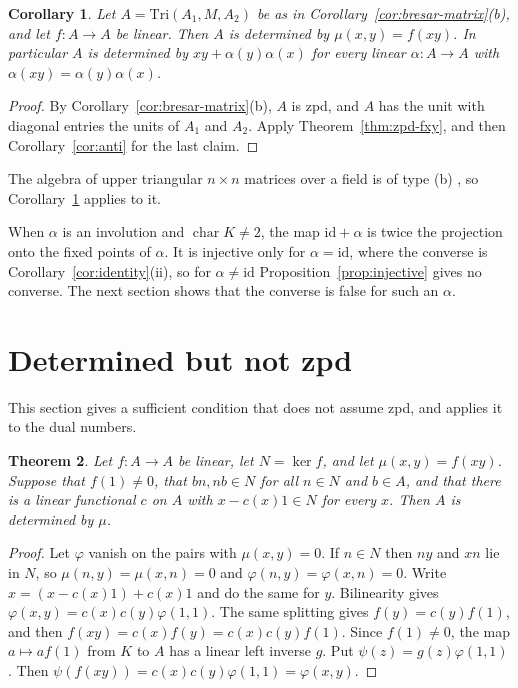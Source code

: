 \documentclass[]{interact}
\theoremstyle{plain}
\newtheorem{theorem}{Theorem}[section]
\newtheorem{corollary}[theorem]{Corollary}
\theoremstyle{definition}
\theoremstyle{remark}
\begin{document}
\begin{corollary}\label{cor:triangular}
Let $A = \mathrm{Tri}(A_1, M, A_2)$ be as in Corollary~\ref{cor:bresar-matrix}(b), and let $f \colon A \to A$ be linear.
Then $A$ is determined by $\mu(x,y) = f(xy)$.
In particular $A$ is determined by $xy + \alpha(y)\alpha(x)$ for every linear $\alpha \colon A \to A$ with $\alpha(xy) = \alpha(y)\alpha(x)$.
\end{corollary}

\begin{proof}
By Corollary~\ref{cor:bresar-matrix}(b), $A$ is zpd, and $A$ has the unit with diagonal entries the units of $A_1$ and $A_2$.
Apply Theorem~\ref{thm:zpd-fxy}, and then Corollary~\ref{cor:anti} for the last claim.
\end{proof}

The algebra of upper triangular $n \times n$ matrices over a field is of type (b) \citep[Example 2.19]{Bresar2021}, so Corollary~\ref{cor:triangular} applies to it. %

When $\alpha$ is an involution and $\operatorname{char} K \neq 2$, the map $\mathrm{id} + \alpha$ is twice the projection onto the fixed points of $\alpha$.
It is injective only for $\alpha = \mathrm{id}$, where the converse is Corollary~\ref{cor:identity}(ii), so for $\alpha \neq \mathrm{id}$ Proposition~\ref{prop:injective} gives no converse.
The next section shows that the converse is false for such an $\alpha$.

\section{Determined but not zpd}\label{sec:beyond}

This section gives a sufficient condition that does not assume zpd, and applies it to the dual numbers.

\begin{theorem}\label{thm:codim}
Let $f \colon A \to A$ be linear, let $N = \ker f$, and let $\mu(x,y) = f(xy)$.
Suppose that $f(1) \neq 0$, that $bn, nb \in N$ for all $n \in N$ and $b \in A$, and that there is a linear functional $c$ on $A$ with $x - c(x)1 \in N$ for every $x$.
Then $A$ is determined by $\mu$.
\end{theorem}

\begin{proof}
Let $\varphi$ vanish on the pairs with $\mu(x,y) = 0$.
If $n \in N$ then $ny$ and $xn$ lie in $N$, so $\mu(n,y) = \mu(x,n) = 0$ and $\varphi(n,y) = \varphi(x,n) = 0$.
Write $x = (x - c(x)1) + c(x)1$ and do the same for $y$.
Bilinearity gives $\varphi(x,y) = c(x)c(y)\varphi(1,1)$.
The same splitting gives $f(y) = c(y) f(1)$, and then $f(xy) = c(x) f(y) = c(x)c(y) f(1)$.
Since $f(1) \neq 0$, the map $a \mapsto a f(1)$ from $K$ to $A$ has a linear left inverse $g$.
Put $\psi(z) = g(z)\varphi(1,1)$.
Then $\psi(f(xy)) = c(x)c(y)\varphi(1,1) = \varphi(x,y)$.
\end{proof}
\end{document}

